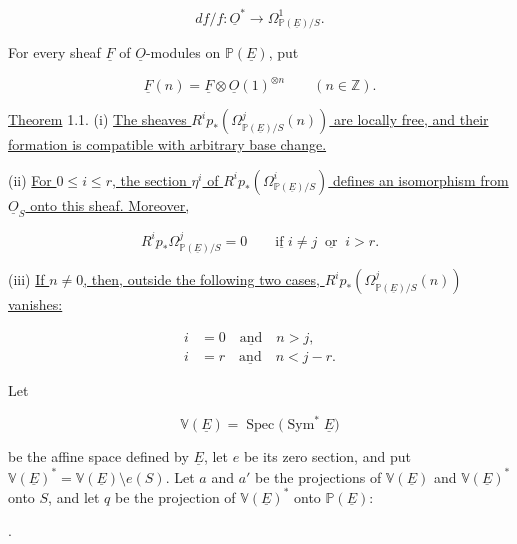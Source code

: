 \begin{equation*}
df/f:\underline O^*\longrightarrow
\Omega^1_{\mathbb P(\underline E)/S}.
\end{equation*}

For every sheaf $\underline F$ of $\underline O$-modules on
$\mathbb P(\underline E)$, put

\begin{equation*}
\underline F(n)=\underline F\otimes\underline O(1)^{\otimes n}
\qquad(n\in\mathbb Z).
\end{equation*}

\underline{Theorem} 1.1. (i) \underline{The sheaves
$R^ip_*(\Omega^j_{\mathbb P(\underline E)/S}(n))$ are locally free, and their
formation is compatible with arbitrary base change.}

(ii) \underline{For $0\leq i\leq r$, the section $\eta^i$ of
$R^ip_*(\Omega^i_{\mathbb P(\underline E)/S})$ defines an isomorphism from
$\underline O_S$ onto this sheaf. Moreover,}

\begin{equation*}
R^ip_*\Omega^j_{\mathbb P(\underline E)/S}=0
\qquad\underline{\text{if }}i\ne j\ \underline{\text{ or }}\ i>r.
\end{equation*}

(iii) \underline{If $n\ne0$, then, outside the following two cases,
$R^ip_*(\Omega^j_{\mathbb P(\underline E)/S}(n))$ vanishes:}

\begin{align}
i&=0\quad\underline{\text{and}}\quad n>j,
  \tag{iii$_a$}\\
i&=r\quad\underline{\text{and}}\quad n<j-r.
  \tag{iii$_b$}
\end{align}

Let

\begin{equation*}
\mathbb V(\underline E)=\operatorname{Spec}
\bigl(\operatorname{Sym}^*\underline E\bigr)
\end{equation*}

be the affine space defined by $\underline E$, let $e$ be its zero section,
and put
$\mathbb V(\underline E)^*=\mathbb V(\underline E)\setminus e(S)$.  Let $a$
and $a'$ be the projections of $\mathbb V(\underline E)$ and
$\mathbb V(\underline E)^*$ onto $S$, and let $q$ be the projection of
$\mathbb V(\underline E)^*$ onto $\mathbb P(\underline E)$:

\begin{center}
\qquad .
\end{center}

